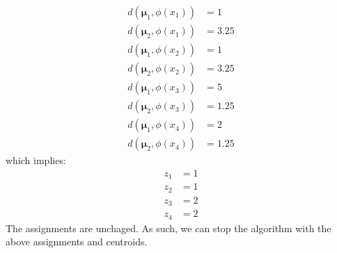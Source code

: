 \documentclass[12pt]{article}
\begin{document}
\begin{enumerate}[label=(\alph*)]
\begin{enumerate}
\begin{enumerate}
\begin{align*}
          d(\bm{\mu}_1, \phi(x_1)) &= 1 \\
          d(\bm{\mu}_2, \phi(x_1)) &= 3.25 \\
          d(\bm{\mu}_1, \phi(x_2)) &= 1 \\
          d(\bm{\mu}_2, \phi(x_2)) &= 3.25 \\
          d(\bm{\mu}_1, \phi(x_3)) &= 5 \\
          d(\bm{\mu}_2, \phi(x_3)) &= 1.25 \\
          d(\bm{\mu}_1, \phi(x_4)) &= 2 \\
          d(\bm{\mu}_2, \phi(x_4)) &= 1.25
        \end{align*}
        which implies:
        \begin{align*}
          z_1 &= 1 \\
          z_2 &= 1 \\
          z_3 &= 2 \\
          z_4 &= 2
        \end{align*}
         The assignments are unchaged. As such, we can stop the algorithm with the above assignments and centroids.
      \end{enumerate}
    \end{enumerate}


\end{enumerate}
\end{document}

